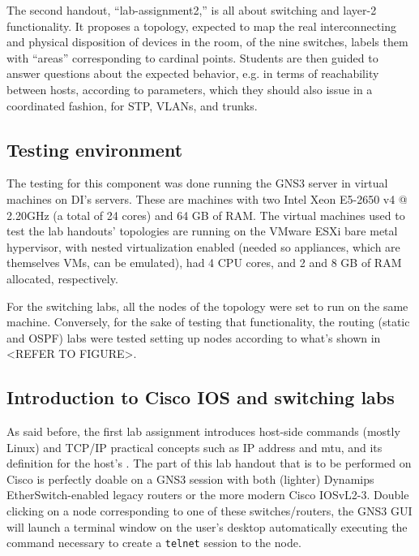 The second handout, ``lab-assignment2,'' is all about switching and layer-2 functionality.
It proposes a topology, expected to map the real interconnecting and physical disposition of devices in the room, of the nine switches, labels them with ``areas'' corresponding to cardinal points.
Students are then guided to answer questions about the expected behavior, e.g. in terms of reachability between hosts, according to parameters, which they should also issue in a coordinated fashion, for STP, VLANs, and trunks.

\subsection{Testing environment}
\label{subsec:environment}

The testing for this component was done running the GNS3 server in virtual machines on DI's servers. %
These are machines with two Intel Xeon E5-2650 v4 @ 2.20GHz (a total of 24 cores) and 64 GB of RAM.
The virtual machines used to test the lab handouts' topologies are running on the VMware ESXi bare metal hypervisor, with nested virtualization enabled (needed so appliances, which are themselves VMs, can be emulated), had 4 CPU cores, and 2 and 8 GB of RAM allocated, respectively.

For the switching labs, all the nodes of the topology were set to run on the same machine.
Conversely, for the sake of testing that functionality, the routing (static and OSPF) labs were tested setting up nodes according to what's shown in <REFER TO FIGURE>. %





\subsection{Introduction to Cisco IOS and switching labs}
\label{subsec:gns3introswitching}

As said before, the first lab assignment introduces host-side commands (mostly Linux) and TCP/IP practical concepts such as IP address and \acrshort{mtu}, and its definition for the host's .
The part of this lab handout that is to be performed on Cisco is perfectly doable on a GNS3 session with both (lighter) Dynamips EtherSwitch-enabled legacy routers or the more modern Cisco IOSvL2-3.
Double clicking on a node corresponding to one of these switches/routers, the GNS3 GUI will launch a terminal window on the user's desktop automatically executing the command necessary to create a \texttt{telnet} session to the node.

